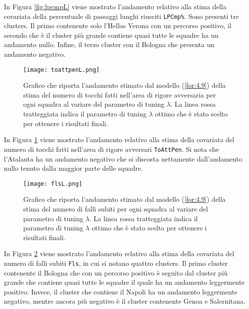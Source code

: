 In Figura \ref{fig:lpcmpL} viene mostrato l'andamento relativo alla stima della covariata della percentuale di passaggi lunghi riusciti \texttt{LPCmp\%}. Sono presenti tre clusters. Il primo contenente solo l'Hellas Verona con un percorso positivo, il secondo che è il cluster più grande contiene quasi tutte le squadre ha un andamento nullo. Infine, il terzo cluster con il Bologna che presenta un andamento negativo.

\begin{figure}[htbp]
	\begin{center}
		\texttt{[image: toattpenL.png]}
		\caption{Grafico che riporta l'andamento stimato dal modello (\ref{for:4.9}) della stima del numero di tocchi fatti nell'area di rigore avversaria per ogni squadra al variare del parametro di tuning $\lambda$. La linea rossa tratteggiata indica il parametro di tuning $\lambda$ ottimo che è stato scelto per ottenere i risultati finali.} \label{fig:toattpenL}
	\end{center}
\end{figure}

In Figura \ref{fig:toattpenL} viene mostrato l'andamento relativo alla stima della covariata del numero di tocchi fatti nell'area di rigore avversari \texttt{ToAttPen}. Si nota che l'Atalanta ha un andamento negativo che si discosta nettamente dall'andamento nullo tenuto dalla maggior parte delle squadre.

\begin{figure}[htbp]
	\begin{center}
		\texttt{[image: flsL.png]}
		\caption{Grafico che riporta l'andamento stimato dal modello (\ref{for:4.9}) della stima del numero di falli subiti per ogni squadra al variare del parametro di tuning $\lambda$. La linea rossa tratteggiata indica il parametro di tuning $\lambda$ ottimo che è stato scelto per ottenere i risultati finali.} \label{fig:flsL}
	\end{center}
\end{figure}

In Figura \ref{fig:flsL} viene mostrato l'andamento relativo alla stima della covariata del numero di falli subiti \texttt{Fls}, in cui si notano quattro clusters. Il primo cluster contenente il Bologna che con un percorso positivo è seguito dal cluster più grande che contiene quasi tutte le squadre il quale ha un andamento leggermente positivo. Invece, il cluster che contiene il Napoli ha un andamento leggermente negativo, mentre ancora più negativo è il cluster contenente Genoa e Salernitana.

